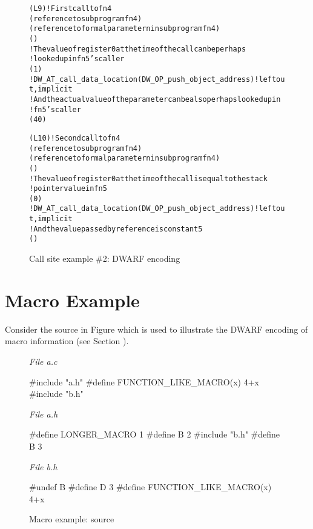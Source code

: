 \begin{figure}[ht]
\begin{dwflisting}
\begin{alltt}

\DWTAGcallsite
    \DWATcallreturnpc(L9)                       ! First call to fn4
    \DWATcallorigin(reference to subprogram fn4)
    \DWTAGcallsiteparameter
        \DWATcallparameter(reference to formal parameter n in subprogram fn4)
        \DWATlocation(\DWOPregzero)
        ! The value of register 0 at the time of the call can be perhaps 
        !   looked up in fn5's caller
        \DWATcallvalue(\DWOPentryvalue{} 1 \DWOPregzero)
        ! DW_AT_call_data_location(DW_OP_push_object_address) ! left out, implicit
        ! And the actual value of the parameter can be also perhaps looked up in
        ! fn5's caller
        \DWATcalldatavalue(\DWOPentryvalue{} 4 \DWOPbregzero{} 0 )
        
\DWTAGcallsite
    \DWATcallreturnpc(L10)                      ! Second call to fn4
    \DWATcallorigin(reference to subprogram fn4)
    \DWTAGcallsiteparameter
        \DWATcallparameter(reference to formal parameter n in subprogram fn4)
        \DWATlocation(\DWOPregzero)
        ! The value of register 0 at the time of the call is equal to the stack
        ! pointer value in fn5
        \DWATcallvalue(\DWOPbregthree{} 0)
        ! DW_AT_call_data_location(DW_OP_push_object_address) ! left out, implicit
        ! And the value passed by reference is constant 5
        \DWATcalldatavalue(\DWOPlitfive)
        
\end{alltt}
\end{dwflisting}
\caption{Call site example \#2: DWARF encoding}
\label{fig:callsiteexample2dwarf}
\end{figure}


\clearpage
\section{Macro Example}
\label{macroexample}
Consider the  source in Figure 
 which is used to illustrate the
DWARF encoding of macro information (see Section ).

\begin{figure}[ht]
\textit{File a.c}
\begin{nlnlisting}
#include "a.h"
#define FUNCTION_LIKE_MACRO(x) 4+x
#include "b.h"
\end{nlnlisting}
\vspace{7mm}
\textit{File a.h}
\begin{nlnlisting}
#define LONGER_MACRO 1
#define B 2
#include "b.h"
#define B 3
\end{nlnlisting}
\vspace{7mm}
\textit{File b.h}
\begin{nlnlisting}
#undef B
#define D 3
#define FUNCTION_LIKE_MACRO(x) 4+x
\end{nlnlisting}
\caption{Macro example: source}
\label{ref:macroexamplesource}
\end{figure}

